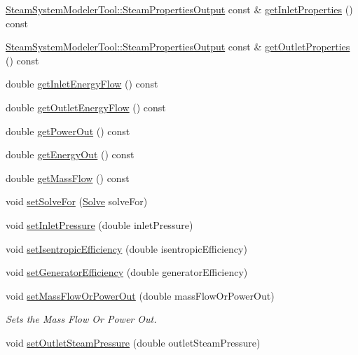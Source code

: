 \begin{DoxyCompactItemize}
\item 
\hyperlink{struct_steam_system_modeler_tool_1_1_steam_properties_output}{Steam\+System\+Modeler\+Tool\+::\+Steam\+Properties\+Output} const  \& \hyperlink{class_turbine_a7a906cf74affed9acfa4045964eccbf6}{get\+Inlet\+Properties} () const
\item 
\hyperlink{struct_steam_system_modeler_tool_1_1_steam_properties_output}{Steam\+System\+Modeler\+Tool\+::\+Steam\+Properties\+Output} const  \& \hyperlink{class_turbine_aa9449622449e78285a258823ff77c8ec}{get\+Outlet\+Properties} () const
\item 
double \hyperlink{class_turbine_ae5d55a7b882e4780d490d43409f8f06c}{get\+Inlet\+Energy\+Flow} () const
\item 
double \hyperlink{class_turbine_aa20c0f9dd81cd9bfd5eda77f588516b5}{get\+Outlet\+Energy\+Flow} () const
\item 
double \hyperlink{class_turbine_a89585cc2fbfdbe67d539eae08c369fa2}{get\+Power\+Out} () const
\item 
double \hyperlink{class_turbine_a143fc660274e0d65ccb8fc55cc2caf83}{get\+Energy\+Out} () const
\item 
double \hyperlink{class_turbine_a4893a203dbbf9db9ca77a0b278c4c118}{get\+Mass\+Flow} () const
\item 
void \hyperlink{class_turbine_a96f54a8fc572dae6c5298289de890f4d}{set\+Solve\+For} (\hyperlink{class_turbine_a9fd7beba6c6f071e228fbe3e07969d2b}{Solve} solve\+For)
\item 
void \hyperlink{class_turbine_a04996baab9a40d449a69c737c00be8e4}{set\+Inlet\+Pressure} (double inlet\+Pressure)
\item 
void \hyperlink{class_turbine_ae67daa481ef48bcf8aef84bcccb4611d}{set\+Isentropic\+Efficiency} (double isentropic\+Efficiency)
\item 
void \hyperlink{class_turbine_a51e9c5050a5be51b86dc23e690bd3f40}{set\+Generator\+Efficiency} (double generator\+Efficiency)
\item 
void \hyperlink{class_turbine_a73522631e2eeefa8ea14d5b537e3e760}{set\+Mass\+Flow\+Or\+Power\+Out} (double mass\+Flow\+Or\+Power\+Out)
\begin{DoxyCompactList}\small\item\em Sets the Mass Flow Or Power Out. \end{DoxyCompactList}\item 
void \hyperlink{class_turbine_ab9612657de02e4523492b687917b4091}{set\+Outlet\+Steam\+Pressure} (double outlet\+Steam\+Pressure)
\item 

\end{DoxyCompactItemize}
